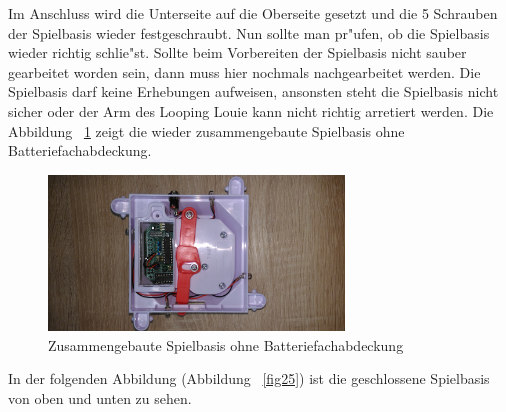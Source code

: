 Im Anschluss wird die Unterseite auf die Oberseite gesetzt und die 5 Schrauben der Spielbasis wieder festgeschraubt. Nun sollte man pr"ufen, ob die Spielbasis wieder richtig schlie"st. Sollte beim Vorbereiten der Spielbasis nicht sauber gearbeitet worden sein, dann muss hier nochmals nachgearbeitet werden. Die Spielbasis darf keine Erhebungen aufweisen, ansonsten steht die Spielbasis nicht sicher oder der Arm des Looping Louie kann nicht richtig arretiert werden.
Die Abbildung ~\ref{fig24} zeigt die wieder zusammengebaute Spielbasis ohne Batteriefachabdeckung.

\vspace{0.5cm}
\begin{figure}[!ht]
	\centering
  	\includegraphics[width=0.7\textwidth]{pictures/loolou_024.jpg}
	\caption{Zusammengebaute Spielbasis ohne Batteriefachabdeckung}
	\label{fig24}
\end{figure}
\vspace{0.5cm} 

In der folgenden Abbildung (Abbildung ~\ref{fig25}) ist die geschlossene Spielbasis von oben und unten zu sehen.

